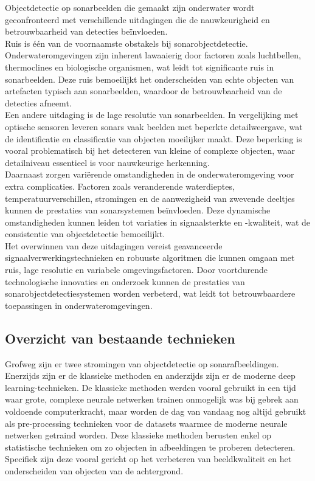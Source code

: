 Objectdetectie op sonarbeelden die gemaakt zijn onderwater wordt geconfronteerd met verschillende uitdagingen die de nauwkeurigheid en betrouwbaarheid van detecties beïnvloeden. \\

Ruis is één van de voornaamste obstakels bij sonarobjectdetectie. Onderwateromgevingen zijn inherent lawaaierig door factoren zoals luchtbellen, \glspl{thermocline} en biologische organismen, wat leidt tot significante ruis in sonarbeelden. Deze ruis bemoeilijkt het onderscheiden van echte objecten van artefacten typisch aan sonarbeelden, waardoor de betrouwbaarheid van de detecties afneemt. \autocite{Aubard_2024_Datasets} \\

Een andere uitdaging is de lage resolutie van sonarbeelden. In vergelijking met optische sensoren leveren sonars vaak beelden met beperkte detailweergave, wat de identificatie en classificatie van objecten moeilijker maakt. Deze beperking is vooral problematisch bij het detecteren van kleine of complexe objecten, waar detailniveau essentieel is voor nauwkeurige herkenning. \autocite{Lee_2018} \\

Daarnaast zorgen variërende omstandigheden in de onderwateromgeving voor extra complicaties. Factoren zoals veranderende waterdieptes, temperatuurverschillen, stromingen en de aanwezigheid van zwevende deeltjes kunnen de prestaties van sonarsystemen beïnvloeden. Deze dynamische omstandigheden kunnen leiden tot variaties in signaalsterkte en -kwaliteit, wat de consistentie van objectdetectie bemoeilijkt. \autocite{Valdenegro_Toro_2019} \\

Het overwinnen van deze uitdagingen vereist geavanceerde signaalverwerkingstechnieken en robuuste algoritmen die kunnen omgaan met ruis, lage resolutie en variabele omgevingsfactoren. Door voortdurende technologische innovaties en onderzoek kunnen de prestaties van sonarobjectdetectiesystemen worden verbeterd, wat leidt tot betrouwbaardere toepassingen in onderwateromgevingen.

\subsection{Overzicht van bestaande technieken}

Grofweg zijn er twee stromingen van objectdetectie op sonarafbeeldingen. Enerzijds zijn er de klassieke methoden en anderzijds zijn er de moderne deep learning-technieken. De klassieke methoden werden vooral gebruikt in een tijd waar grote, complexe neurale netwerken trainen onmogelijk was bij gebrek aan voldoende computerkracht, maar worden de dag van vandaag nog altijd gebruikt als pre-processing technieken voor de datasets waarmee de moderne neurale netwerken getraind worden. Deze klassieke methoden berusten enkel op statistische technieken om zo objecten in afbeeldingen te proberen detecteren. Specifiek zijn deze vooral gericht op het verbeteren van beeldkwaliteit en het onderscheiden van objecten van de achtergrond.

